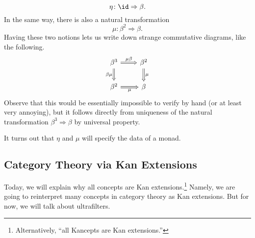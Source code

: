 \documentclass[../notes.tex]{subfiles}
\begin{document}
\[\eta\colon\id\Rightarrow\beta.\]
In the same way, there is also a natural transformation
\[\mu\colon\beta^2\Rightarrow\beta.\]
Having these two notions lets us write down strange commutative diagrams, like the following.
\[\begin{tikzcd}
	{\beta^3} & {\beta^2} \\
	{\beta^2} & \beta
	\arrow["\mu\beta", Rightarrow, from=1-1, to=1-2]
	\arrow["\mu", Rightarrow, from=1-2, to=2-2]
	\arrow["\mu"', Rightarrow, from=2-1, to=2-2]
	\arrow["\beta\mu"', Rightarrow, from=1-1, to=2-1]
\end{tikzcd}\]
Observe that this would be essentially impossible to verify by hand (or at least very annoying), but it follows directly from uniqueness of the natural transformation $\beta^3\Rightarrow\beta$ by universal property.
\begin{remark}
	It turns out that $\eta$ and $\mu$ will specify the data of a monad.
\end{remark}

\subsection{Category Theory via Kan Extensions}
Today, we will explain why all concepts are Kan extensions.\footnote{Alternatively, ``all Kancepts are Kan extensions.''} Namely, we are going to reinterpret many concepts in category theory as Kan extensions. But for now, we will talk about ultrafilters.
\end{document}
